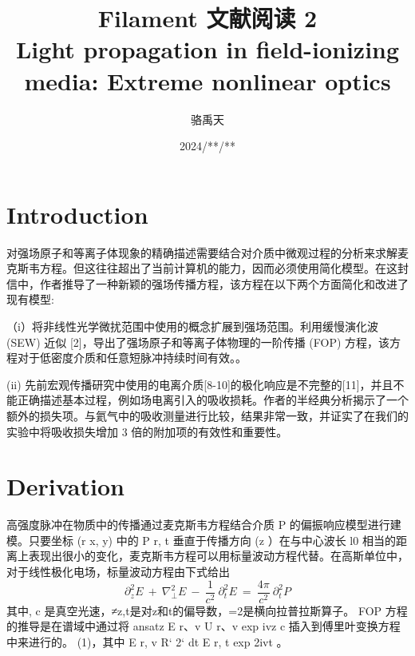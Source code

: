 \documentclass[14pt,a4paper,oneside]{article}
\title{\textbf{Filament 文献阅读 2\\Light propagation in field-ionizing media: Extreme nonlinear optics}\cite{geisslerLightPropagationFieldionizing1999}}                           %
\author{骆禹天}                                           %
\date{2024/**/**}                                        %
\begin{document}

\maketitle

\setcounter{page}{1}          %


\tableofcontents              %

\newpage
\setcounter{page}{1}          %








\section{Introduction}

对强场原子和等离子体现象的精确描述需要结合对介质中微观过程的分析来求解麦克斯韦方程。但这往往超出了当前计算机的能力，因而必须使用简化模型。在这封信中，作者推导了一种新颖的强场传播方程，该方程在以下两个方面简化和改进了现有模型:

（i）将非线性光学微扰范围中使用的概念扩展到强场范围。利用缓慢演化波 (SEW) 近似 [2]，导出了强场原子和等离子体物理的一阶传播 (FOP) 方程，该方程对于低密度介质和任意短脉冲持续时间有效。。

(ii) 先前宏观传播研究中使用的电离介质[8-10]的极化响应是不完整的[11]，并且不能正确描述基本过程，例如场电离引入的吸收损耗。作者的半经典分析揭示了一个额外的损失项。与氦气中的吸收测量进行比较，结果非常一致，并证实了在我们的实验中将吸收损失增加 3 倍的附加项的有效性和重要性。

\section{Derivation}

高强度脉冲在物质中的传播通过麦克斯韦方程结合介质 P 的偏振响应模型进行建模。只要坐标 (r x, y) 中的 P r, t 垂直于传播方向 (z ）在与中心波长 l0 相当的距离上表现出很小的变化，麦克斯韦方程可以用标量波动方程代替。在高斯单位中，对于线性极化电场，标量波动方程由下式给出
\begin{equation}
    \partial_z^2E\:+\:\nabla_\perp^2E\:-\:\frac1{c^2}\:\partial_t^2E\:=\:\frac{4\pi}{c^2}\:\partial_t^2P
    \label{eq:1}
\end{equation}
其中, c 是真空光速，≠z,t是对z和t的偏导数，=2是横向拉普拉斯算子。 FOP 方程的推导是在谱域中通过将 ansatz E r、v U r、v exp ivz c 插入到傅里叶变换方程中来进行的。 (1)，其中 E r, v R` 2` dt E r, t exp 2ivt 。







\newpage

\clearpage           %




\end{document}
